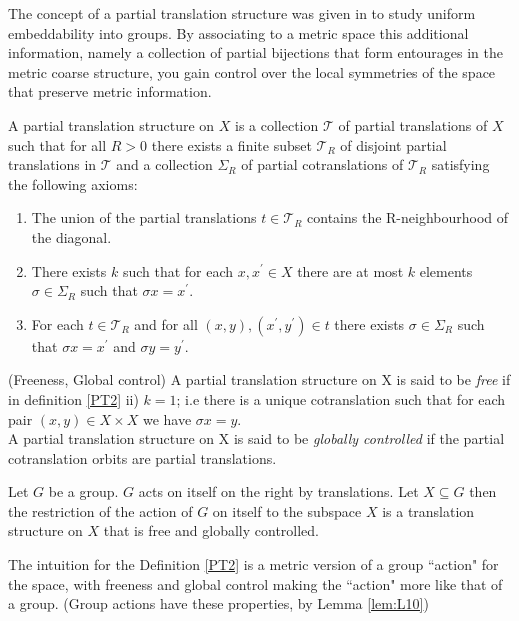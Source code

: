 \begin{corollary}
The concept of a partial translation structure was given in \cite{MR2363428} to study uniform embeddability into groups. By associating to a metric space this additional information, namely a collection of partial bijections that form entourages in the metric coarse structure, you gain control over the local symmetries of the space that preserve metric information. 


\begin{definition}\label{PT2}
A partial translation structure on $X$ is a collection $\mathcal{T}$ of partial translations of $X$ such that for all $R>0$ there exists a finite subset $\mathcal{T}_{R}$ of disjoint partial translations in $\mathcal{T}$ and a collection $\Sigma_{R}$ of partial cotranslations of $\mathcal{T}_{R}$ satisfying the following axioms:
\begin{enumerate}
\item The union of the partial translations  $t \in \mathcal{T}_{R}$ contains the R-neighbourhood of the diagonal.
\item There exists $k$ such that for each $x,x^{'} \in X$ there are at most $k$ elements $\sigma \in \Sigma_{R}$ such that $\sigma x=x^{'}$.
\item For each $t \in \mathcal{T}_{R}$ and for all $(x,y),(x^{'},y^{'}) \in t$ there exists $\sigma \in \Sigma_{R}$ such that $\sigma x=x^{'}$ and $\sigma y=y^{'}$.
\end{enumerate}
\end{definition}

\begin{definition}(Freeness, Global control)
A partial translation structure on X is said to be \textit{free} if in definition \ref{PT2} ii) $k=1$; i.e there is a unique cotranslation such that for each pair $(x,y)\in X \times X$ we have $\sigma x = y$.\\
A partial translation structure on X is said to be \textit{globally controlled} if the partial cotranslation orbits are partial translations. 
\end{definition}

\begin{lemma}\label{lem:L10}
Let $G$ be a group. $G$ acts on itself on the right by translations. Let $X \subseteq G$ then the restriction of the action of $G$ on itself to the subspace $X$ is a translation structure on $X$ that is free and globally controlled.
\end{lemma}

The intuition for the Definition \ref{PT2} is a metric version of a group ``action" for the space, with freeness and global control making the ``action" more like that of a group. (Group actions have these properties, by Lemma \ref{lem:L10})


\end{corollary}
